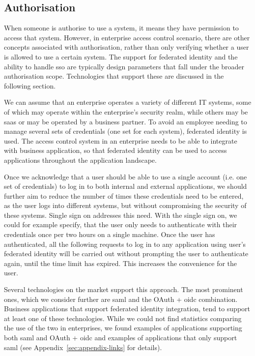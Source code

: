 \subsection{Authorisation}\label{sec:analysis-authorisation}

When someone is authorise to use a system, it means they have permission to access that system. However, in enterprise access control scenario, there are other concepts associated with authorisation, rather than only verifying whether a user is allowed to use a certain system. The support for federated identity and the ability to handle \acrfull{sso} are typically design parameters that fall under the broader authorisation scope. Technologies that support these are discussed in the following section.

We can assume that an enterprise operates a variety of different IT systems, some of which may operate within the enterprise's security realm, while others may be \acrshort{saas} or may be operated by a business partner. To avoid an employee needing to manage several sets of credentials (one set for each system), federated identity is used. The access control system in an enterprise needs to be able to integrate with business application, so that federated identity can be used to access applications throughout the application landscape.

Once we acknowledge that a user should be able to use a single account (i.e. one set of credentials) to log in to both internal and external applications, we should further aim to reduce the number of times these credentials need to be entered, as the user logs into different systems, but without compromising the security of these systems. Single sign on addresses this need. With the single sign on, we could for example specify, that the user only needs to authenticate with their credentials once per two hours on a single machine. Once the user has authenticated, all the following requests to log in to any application using user's federated identity will be carried out without prompting the user to authenticate again, until the time limit has expired. This increases the convenience for the user.

Several technologies on the market support this approach. The most prominent ones, which we consider further are \acrshort{saml} and the OAuth + \acrshort{oidc} combination. Business applications that support federated identity integration, tend to support at least one of these technologies. While we could not find statistics comparing the use of the two in enterprises, we found examples of applications supporting both \acrshort{saml} and OAuth + \acrshort{oidc} and examples of applications that only support \acrshort{saml} (see Appendix~\ref{sec:appendix-links} for details). 

